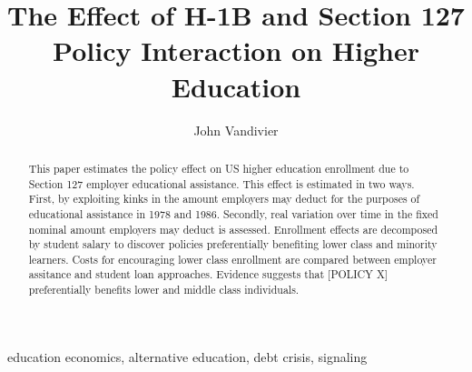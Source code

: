 \documentclass[review]{elsarticle}
\begin{document}
\begin{frontmatter}

\title{
    The Effect of H-1B and Section 127 Policy Interaction on Higher Education
}
\tnotetext[titlenotes]{
}

\author[mymainaddress]{John Vandivier} %
\address[mymainaddress]{4400 University Dr, Fairfax, VA 22030}

\begin{abstract}
    This paper estimates the policy effect on US higher education enrollment due to Section 127 employer educational assistance.
    This effect is estimated in two ways.
    First, by exploiting kinks in the amount employers may deduct for the purposes of educational assistance in 1978 and 1986.
    Secondly, real variation over time in the fixed nominal amount employers may deduct is assessed.
    Enrollment effects are decomposed by student salary to discover policies preferentially benefiting lower class and minority learners.
    Costs for encouraging lower class enrollment are compared between employer assitance and student loan approaches.
    Evidence suggests that [POLICY X] preferentially benefits lower and middle class individuals.
\end{abstract}

\begin{keyword}
education economics, alternative education, debt crisis, signaling
\MSC[2010] %
\end{keyword}

\end{frontmatter}
\end{document}
